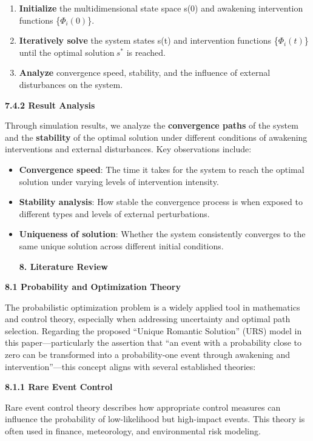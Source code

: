 \documentclass[
]{article}
\begin{document}
\begin{enumerate}
\def\labelenumi{\arabic{enumi}.}
\item
  \textbf{Initialize} the multidimensional state space s(0) and
  awakening intervention functions \{\(\Phi_{i}(0)\)\}.
\item
  \textbf{Iteratively solve} the system states s(t) and intervention
  functions \{\(\Phi_{i}(t)\)\} until the optimal solution\(\ s^{*}\) is
  reached.
\item
  \textbf{Analyze} convergence speed, stability, and the influence of
  external disturbances on the system.
\end{enumerate}

\textbf{7.4.2 Result Analysis}

Through simulation results, we analyze the \textbf{convergence paths} of
the system and the \textbf{stability} of the optimal solution under
different conditions of awakening interventions and external
disturbances. Key observations include:

\begin{itemize}
\item
  \textbf{Convergence speed}: The time it takes for the system to reach
  the optimal solution under varying levels of intervention intensity.
\item
  \textbf{Stability analysis}: How stable the convergence process is
  when exposed to different types and levels of external perturbations.
\item
  \textbf{Uniqueness of solution}: Whether the system consistently
  converges to the same unique solution across different initial
  conditions.

  \textbf{8. Literature Review}
\end{itemize}

\textbf{8.1 Probability and Optimization Theory}

The probabilistic optimization problem is a widely applied tool in
mathematics and control theory, especially when addressing uncertainty
and optimal path selection. Regarding the proposed ``Unique Romantic
Solution'' (URS) model in this paper---particularly the assertion that
``an event with a probability close to zero can be transformed into a
probability-one event through awakening and intervention''---this
concept aligns with several established theories:

\textbf{8.1.1 Rare Event Control}

Rare event control theory describes how appropriate control measures can
influence the probability of low-likelihood but high-impact events. This
theory is often used in finance, meteorology, and environmental risk
modeling.
\end{document}
